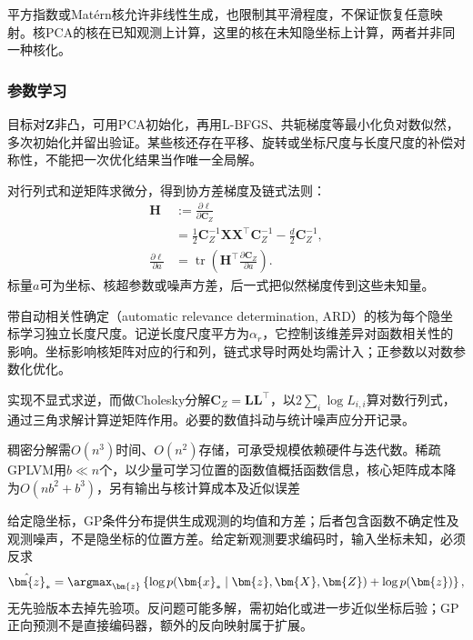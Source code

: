 平方指数或Matérn核允许非线性生成，也限制其平滑程度，不保证恢复任意映射。核PCA的核在已知观测上计算，这里的核在未知隐坐标上计算，两者并非同一种核化。

\subsubsection{参数学习}
\label{sec:dim-gplvm-learning}

目标对$\bm{Z}$非凸，可用PCA初始化，再用L-BFGS、共轭梯度等最小化负对数似然，多次初始化并留出验证。某些核还存在平移、旋转或坐标尺度与长度尺度的补偿对称性，不能把一次优化结果当作唯一全局解。

对行列式和逆矩阵求微分，得到协方差梯度及链式法则：
\begin{equation}
\label{eq:dim-gplvm-gradient}
\begin{aligned}
\bm{H}&:=\frac{\partial\ell}{\partial\bm{C}_Z}\\
&=\frac12\bm{C}_Z^{-1}\bm{X}\bm{X}^\top\bm{C}_Z^{-1}
-\frac d2\bm{C}_Z^{-1},\\
\frac{\partial\ell}{\partial a}
&=\operatorname{tr}\left(
\bm{H}^\top\frac{\partial\bm{C}_Z}{\partial a}\right).
\end{aligned}
\end{equation}
标量$a$可为坐标、核超参数或噪声方差，后一式把似然梯度传到这些未知量。

带自动相关性确定（automatic relevance determination, ARD）的核为每个隐坐标学习独立长度尺度。记逆长度尺度平方为$\alpha_r$，它控制该维差异对函数相关性的影响。坐标影响核矩阵对应的行和列，链式求导时两处均需计入；正参数以对数参数化优化。

实现不显式求逆，而做Cholesky分解$\bm{C}_Z=\bm{L}\bm{L}^\top$，以$2\sum_i\log L_{i,i}$算对数行列式，通过三角求解计算逆矩阵作用。必要的数值抖动与统计噪声应分开记录。

稠密分解需$O(n^3)$时间、$O(n^2)$存储，可承受规模依赖硬件与迭代数。稀疏GPLVM用$b\ll n$个，以少量可学习位置的函数值概括函数信息，核心矩阵成本降为$O(nb^2+b^3)$，另有输出与核计算成本及近似误差

给定隐坐标，GP条件分布提供生成观测的均值和方差；后者包含函数不确定性及观测噪声，不是隐坐标的位置方差。给定新观测要求编码时，输入坐标未知，必须反求
\begin{equation}
\label{eq:dim-gplvm-encoding}
\hat{\bm{z}}_*=\argmax_{\bm{z}}
\left\{\log p(\bm{x}_*\mid\bm{z},\bm{X},\bm{Z})
+\log p(\bm{z})\right\},
\end{equation}
无先验版本去掉先验项。反问题可能多解，需初始化或进一步近似坐标后验；GP正向预测不是直接编码器，额外的反向映射属于扩展。

